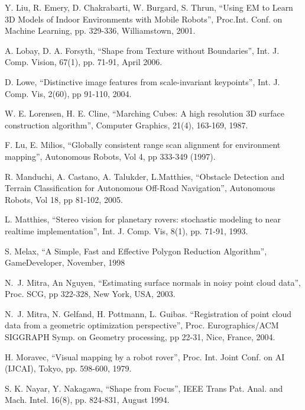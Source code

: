 \documentclass[twocolumn,oneside]{book}
\begin{document}
\begin{thebibliography}{99}

Y. Liu, R. Emery, D. Chakrabarti, W. Burgard, S. Thrun, 
``Using EM to Learn 3D Models of Indoor Environments with Mobile
Robots'', 
Proc.Int. Conf. on Machine Learning, pp. 329-336, Williamstown, 2001.

A. Lobay, D. A. Forsyth, 
``Shape from Texture without Boundaries'',
Int. J. Comp. Vision, 67(1), pp. 71-91, April 2006.

D. Lowe, 
``Distinctive image features from scale-invariant keypoints'',
Int. J. Comp. Vis, 2(60), pp 91-110, 2004.

W. E. Lorensen, H. E. Cline,
``Marching Cubes: A high resolution 3D surface construction algorithm'',
Computer Graphics, 21(4), 163-169, 1987.

F. Lu, E. Milios,
``Globally consistent range scan alignment for environment mapping'',
Autonomous Robots, Vol 4, pp 333-349 (1997).

R. Manduchi, A. Castano, A. Talukder, L.Matthies,
``Obstacle Detection and Terrain Classification for Autonomous Off-Road Navigation'',
Autonomous Robots, Vol 18, pp 81-102, 2005.

L. Matthies,
``Stereo vision for planetary rovers: stochastic
modeling to near realtime implementation'',
Int. J. Comp. Vis,  8(1), pp. 71-91, 1993.

S. Melax,
``A Simple, Fast and Effective Polygon Reduction Algorithm'',
GameDeveloper, November, 1998

N.~J. Mitra, An Nguyen,
``Estimating surface normals in noisy point cloud data'',
Proc. SCG, pp 322-328, New York, USA, 2003.
  
N.~J. Mitra, N. Gelfand, H. Pottmann, L. Guibas. 
``Registration of point cloud data from a geometric optimization perspective'',
Proc. Eurographics/ACM SIGGRAPH Symp. on Geometry processing, pp 22-31,
Nice, France, 2004.

H. Moravec, 
``Visual mapping by a robot rover'',
Proc. Int. Joint Conf. on AI (IJCAI), Tokyo, pp. 598-600, 1979.

S. K. Nayar, Y. Nakagawa, 
``Shape from Focus'',
IEEE Trans Pat. Anal. and Mach. Intel. 16(8), pp. 824-831, August 1994.


\end{thebibliography}
\end{document}
